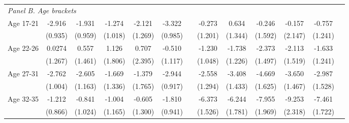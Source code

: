 \begin{landscape}
\begin{table}[H]
\begin{threeparttable}
{\begin{tabular}{l*{12}{c}}
 				\multicolumn{5}{l}{\emph{Panel B. Age brackets}} \\
 				\hspace*{10pt}Age 17-21	&      -2.916\sym{***}&      -1.931\sym{*}  &      -1.274         &      -2.121		    &      -3.322\sym{***} &&      -0.273         &       0.634         &      -0.246         &      -0.157         &      -0.757         \\
				                    	&     (0.935)         &     (0.959)         &     (1.018)         &     (1.269)         &     (0.985)          &&     (1.201)         &     (1.344)         &     (1.592)         &     (2.147)         &     (1.241)         \\
				\hspace*{10pt}Age 22-26	&      0.0274         &       0.557         &       1.126         &       0.707         &      -0.510          &&      -1.230         &      -1.738         &      -2.373         &      -2.113         &      -1.633         \\
				                    	&     (1.267)         &     (1.461)         &     (1.806)         &     (2.395)         &     (1.117)          &&     (1.048)         &     (1.226)         &     (1.497)         &     (1.519)         &     (1.241)         \\
				\hspace*{10pt}Age 27-31	&      -2.762\sym{**} &      -2.605\sym{**} &      -1.669         &      -1.379         &      -2.944\sym{***} &&      -2.558\sym{*}  &      -3.408\sym{**} &      -4.669\sym{**} &      -3.650\sym{**} &      -2.987\sym{*}  \\
				                    	&     (1.004)         &     (1.163)         &     (1.336)         &     (1.765)         &     (0.917)          &&     (1.294)         &     (1.433)         &     (1.625)         &     (1.467)         &     (1.528)         \\
				\hspace*{10pt}Age 32-35	&      -1.212         &      -0.841         &      -1.004         &      -0.605         &      -1.810\sym{*}   &&      -6.373\sym{***}&      -6.244\sym{***}&      -7.955\sym{***}&      -9.253\sym{***}&      -7.461\sym{***}\\
				                   		&     (0.866)         &     (1.024)         &     (1.165)         &     (1.300)         &     (0.941)          &&     (1.526)         &     (1.781)         &     (1.969)         &     (2.318)         &     (1.722)         \\
 				\bottomrule 

\end{tabular}}
\end{threeparttable}
\end{table}
\end{landscape}
